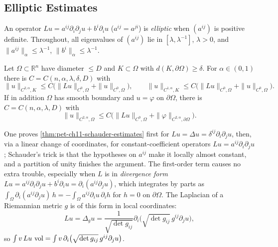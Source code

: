 \subsection{Elliptic Estimates}

\begin{definition}
  \label{def:pet-ch11-elliptic-operator}
  An operator $Lu=a^{ij}\partial_i\partial_ju+b^i\partial_iu$ ($a^{ij}=a^{ji}$)
  is \emph{elliptic} when $(a^{ij})$ is positive definite. Throughout, all
  eigenvalues of $(a^{ij})$ lie in $[\lambda,\lambda^{-1}]$, $\lambda>0$, and
  $\|a^{ij}\|_\alpha\le\lambda^{-1}$, $\|b^i\|_\alpha\le\lambda^{-1}$.
\end{definition}

\begin{theorem}
  \label{thm:pet-ch11-schauder-estimates}
  Let $\Omega\subset\mathbb{R}^n$ have diameter $\le D$ and $K\subset\Omega$ with
  $d(K,\partial\Omega)\ge\delta$. For $\alpha\in(0,1)$ there is
  $C=C(n,\alpha,\lambda,\delta,D)$ with
  \[
    \|u\|_{C^{2,\alpha},K}\le C\big(\|Lu\|_{C^0,\Omega}+\|u\|_{C^0,\Omega}\big),
    \qquad
    \|u\|_{C^{1,\alpha},K}\le C\big(\|Lu\|_{C^0,\Omega}+\|u\|_{C^0,\Omega}\big).
  \]
  If in addition $\Omega$ has smooth boundary and $u=\varphi$ on
  $\partial\Omega$, there is $C=C(n,\alpha,\lambda,D)$ with
  \[
    \|u\|_{C^{2,\alpha},\Omega}\le C\big(\|Lu\|_{C^0,\Omega}+\|\varphi\|_{C^{2,\alpha},\partial\Omega}\big).
  \]
\end{theorem}

\begin{remark}
  \label{rem:pet-ch11-divergence-form-laplace-beltrami}
  One proves \cref{thm:pet-ch11-schauder-estimates} first for $Lu=\Delta u=\delta^{ij}\partial_i\partial_ju$,
  then, via a linear change of coordinates, for constant-coefficient
  operators $Lu=a^{ij}\partial_i\partial_ju$; Schauder's trick is that the
  hypotheses on $a^{ij}$ make it locally almost constant, and a partition of
  unity finishes the argument. The first-order term causes no extra trouble,
  especially when $L$ is in \emph{divergence form}
  $Lu=a^{ij}\partial_i\partial_ju+b^i\partial_iu=\partial_i(a^{ij}\partial_ju)$,
  which integrates by parts as
  $\int_\Omega\partial_i(a^{ij}\partial_ju)\,h=-\int_\Omega a^{ij}\partial_iu\,\partial_ih$
  for $h=0$ on $\partial\Omega$. The Laplacian of a Riemannian metric $g$ is of
  this form in local coordinates:
  \[
    Lu=\Delta_gu=\frac1{\sqrt{\det g_{ij}}}\partial_i\big(\sqrt{\det g_{ij}}\,g^{ij}\partial_ju\big),
  \]
  so $\int v\,Lu\,\operatorname{vol}=\int v\,\partial_i\big(\sqrt{\det g_{ij}}\,g^{ij}\partial_ju\big)$.
\end{remark}

